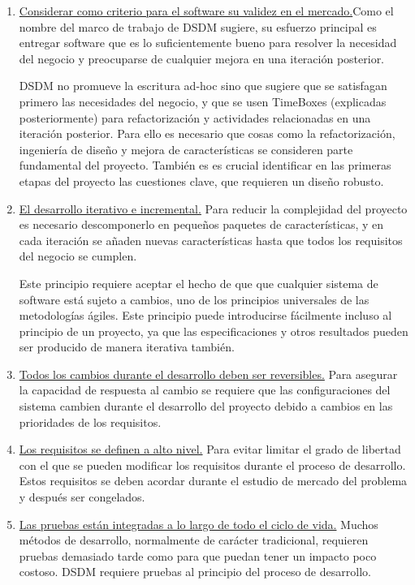 \documentclass[12pt,a4paper]{article}
\begin{document}
\begin{enumerate}
\item \underline{Considerar como criterio para el software su validez en el mercado.}Como el nombre del marco de trabajo de DSDM sugiere, su esfuerzo principal es entregar
software que es lo suficientemente bueno para resolver la necesidad del negocio y preocuparse de cualquier mejora en una iteración posterior.


 DSDM no promueve la escritura ad-hoc sino que sugiere que se satisfagan  primero las necesidades del negocio, y que se usen TimeBoxes (explicadas posteriormente) para
refactorización y actividades relacionadas en una iteración posterior. Para ello es necesario que cosas como  la refactorización, ingeniería de diseño y mejora de características se consideren parte fundamental del proyecto. También es es crucial identificar en las primeras etapas del proyecto las cuestiones clave, que requieren un diseño robusto. 




\item \underline{El desarrollo iterativo e incremental.} 
Para reducir la complejidad del proyecto es necesario descomponerlo en pequeños paquetes de  características, y en cada iteración se añaden nuevas características hasta que todos los requisitos del negocio se cumplen.

 Este principio requiere aceptar el hecho de que que cualquier sistema de software está sujeto a cambios, uno de los principios universales de las metodologías ágiles. Este principio puede introducirse fácilmente incluso al principio de un proyecto, ya que las especificaciones y otros resultados pueden ser producido de manera iterativa también. 


\item  \underline{Todos los cambios durante el desarrollo deben ser reversibles.} Para asegurar la capacidad de respuesta al cambio se requiere que las configuraciones del sistema cambien durante el desarrollo del proyecto debido a cambios en las prioridades de los requisitos.



\item \underline{Los requisitos se definen a alto nivel.} Para evitar limitar el grado de libertad con el que se pueden modificar los requisitos durante el proceso de desarrollo.  Estos requisitos se deben acordar durante el estudio de mercado del problema y después ser congelados.

\item  \underline{Las pruebas están integradas a lo largo de todo el ciclo de vida.} Muchos métodos de desarrollo, normalmente de carácter tradicional, requieren pruebas demasiado tarde como para que puedan tener un impacto poco costoso. DSDM requiere pruebas al principio del proceso de desarrollo. 



\end{enumerate}
\end{document}
